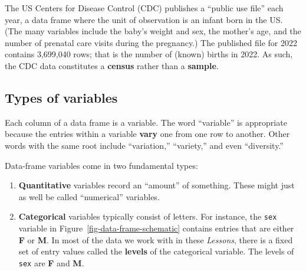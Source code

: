 \documentclass[
  letterpaper,
  DIV=11,
  numbers=noendperiod,
  oneside]{scrartcl}
\begin{document}
\begin{tcolorbox}[enhanced jigsaw, colbacktitle=quarto-callout-note-color!10!white, opacityback=0, breakable, opacitybacktitle=0.6, colback=white, coltitle=black, arc=.35mm, title=\textcolor{quarto-callout-note-color}{\faInfo}\hspace{0.5em}{Example: New-born babies}, left=2mm, colframe=quarto-callout-note-color-frame, rightrule=.15mm, bottomrule=.15mm, leftrule=.75mm, bottomtitle=1mm, toptitle=1mm, titlerule=0mm, toprule=.15mm]

The US Centers for Disease Control (CDC) publishes a ``public use file''
each year, a data frame where the unit of observation is an infant born
in the US. (The many variables include the baby's weight and sex, the
mother's age, and the number of prenatal care visits during the
pregnancy.) The published file for 2022 contains 3,699,040 rows; that is
the number of (known) births in 2022. As such, the CDC data constitutes
a \textbf{census} rather than a \textbf{sample}.

\end{tcolorbox}

\subsection{Types of variables}\label{types-of-variables}

Each column of a data frame is a variable. The word ``variable'' is
appropriate because the entries within a variable \textbf{vary} one from
one row to another. Other words with the same root include
``variation,'' ``variety,'' and even ``diversity.''

Data-frame variables come in two fundamental types:

{}

\begin{enumerate}
\def\labelenumi{\arabic{enumi}.}
\item
  \textbf{Quantitative} variables record an ``amount'' of something.
  These might just as well be called ``numerical'' variables.
\item
  \textbf{Categorical} variables typically consist of letters. For
  instance, the \texttt{sex} variable in
  Figure~\ref{fig-data-frame-schematic} contains entries that are either
  \textbf{F} or \textbf{M}. In most of the data we work with in these
  \emph{Lessons}, there is a fixed set of entry values called the
  \textbf{levels} of the categorical variable. The levels of
  \texttt{sex} are \textbf{F} and \textbf{M}.
\end{enumerate}
\end{document}
